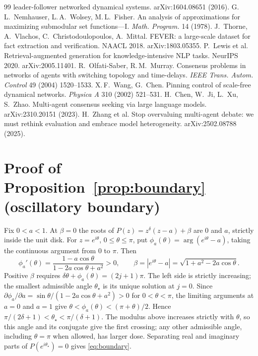 \documentclass[11pt]{article}
\theoremstyle{definition}
\begin{document}
\begin{thebibliography}{99}
leader-follower networked dynamical systems. arXiv:1604.08651 (2016).
 G.\,L.\ Nemhauser, L.\,A.\ Wolsey, M.\,L.\ Fisher. An analysis of approximations
for maximizing submodular set functions---I. \emph{Math. Program.} 14 (1978).
 J.\ Thorne, A.\ Vlachos, C.\ Christodoulopoulos, A.\ Mittal. FEVER: a large-scale
dataset for fact extraction and verification. NAACL 2018. arXiv:1803.05355.
 P.\ Lewis et al. Retrieval-augmented generation for knowledge-intensive NLP tasks.
NeurIPS 2020. arXiv:2005.11401.
 R.\ Olfati-Saber, R.\,M.\ Murray. Consensus problems in networks of agents with
switching topology and time-delays. \emph{IEEE Trans. Autom. Control} 49 (2004) 1520--1533.
 X.\,F.\ Wang, G.\ Chen. Pinning control of scale-free dynamical networks.
\emph{Physica A} 310 (2002) 521--531.
 H.\ Chen, W.\ Ji, L.\ Xu, S.\ Zhao. Multi-agent consensus seeking via large
language models. arXiv:2310.20151 (2023).
 H.\ Zhang et al. Stop overvaluing multi-agent debate: we must rethink
evaluation and embrace model heterogeneity. arXiv:2502.08788 (2025).

\end{thebibliography}

\appendix
\renewcommand{\thesection}{Appendix~\Alph{section}}
\section{Proof of Proposition~\ref{prop:boundary} (oscillatory boundary)}\label{app:proofs}
Fix $0<a<1$. At $\beta=0$ the roots of $P(z)=z^\delta(z-a)+\beta$ are $0$ and $a$, strictly
inside the unit disk. For $z=e^{i\theta}$, $0\le\theta\le\pi$, put
$\phi_a(\theta)=\arg(e^{i\theta}-a)$, taking the continuous argument from $0$ to $\pi$. Then
\[
  \phi_a'(\theta)=\frac{1-a\cos\theta}{1-2a\cos\theta+a^2}>0,
  \qquad \beta=|e^{i\theta}-a|=\sqrt{1+a^2-2a\cos\theta}.
\]
Positive $\beta$ requires $\delta\theta+\phi_a(\theta)=(2j+1)\pi$. The left side is strictly
increasing; the smallest admissible angle $\theta_\star$ is its unique solution at $j=0$.
Since $\partial\phi_a/\partial a=\sin\theta/(1-2a\cos\theta+a^2)>0$ for $0<\theta<\pi$,
the limiting arguments at $a=0$ and $a=1$ give $\theta<\phi_a(\theta)<(\pi+\theta)/2$. Hence
$\pi/(2\delta+1)<\theta_\star<\pi/(\delta+1)$. The modulus above increases strictly with
$\theta$, so this angle and its conjugate give the first crossing; any other admissible angle,
including $\theta=\pi$ when allowed, has larger dose. Separating real and imaginary parts of
$P(e^{i\theta_\star})=0$ gives \eqref{eq:boundary}.
\end{document}
